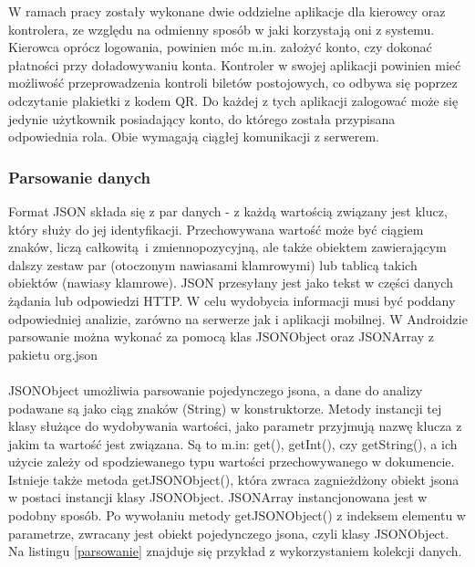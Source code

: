 W ramach pracy zostały wykonane dwie oddzielne aplikacje dla kierowcy oraz kontrolera, ze względu na odmienny sposób w jaki korzystają oni z systemu. Kierowca oprócz logowania, powinien móc m.in. założyć konto, czy dokonać płatności przy doładowywaniu konta. Kontroler w swojej aplikacji powinien mieć możliwość przeprowadzenia kontroli biletów postojowych, co odbywa się poprzez odczytanie plakietki z kodem QR. Do każdej z tych aplikacji zalogować może się jedynie użytkownik posiadający konto, do którego została przypisana odpowiednia rola. Obie wymagają ciągłej komunikacji z serwerem.

\subsubsection*{Parsowanie danych}

Format JSON składa się z par danych - z każdą wartością związany jest klucz, który służy do jej identyfikacji. Przechowywana wartość może być ciągiem znaków, liczą całkowitą i zmiennopozycyjną, ale także obiektem zawierającym dalszy zestaw par (otoczonym nawiasami klamrowymi) lub tablicą takich obiektów (nawiasy klamrowe). JSON przesyłany jest jako tekst w części danych żądania lub odpowiedzi HTTP. W celu wydobycia informacji musi być poddany odpowiedniej analizie, zarówno na serwerze jak i aplikacji mobilnej. W Androidzie parsowanie można wykonać za pomocą klas JSONObject oraz JSONArray z pakietu org.json 
\\
\\
JSONObject umożliwia parsowanie pojedynczego jsona, a dane do analizy podawane są jako ciąg znaków (String) w konstruktorze. Metody instancji tej klasy służące do wydobywania wartości, jako parametr przyjmują nazwę klucza z jakim ta wartość jest związana. Są to m.in: get(), getInt(), czy getString(), a ich użycie zależy od spodziewanego typu wartości przechowywanego w dokumencie. Istnieje także metoda getJSONObject(), która zwraca zagnieżdżony obiekt jsona w postaci instancji klasy JSONObject. JSONArray instancjonowana jest w podobny sposób. Po wywołaniu metody getJSONObject() z indeksem elementu w parametrze, zwracany jest obiekt pojedynczego jsona, czyli klasy JSONObject. Na listingu \ref{parsowanie} znajduje się przykład z wykorzystaniem kolekcji danych.

\begin{singlespace}
	\label{parsowanie}
	\vspace{0.3cm}
	\inputminted[fontsize=\footnotesize, linenos=true]{java}{src/imp/parsowanie-json.java}
\end{singlespace}

